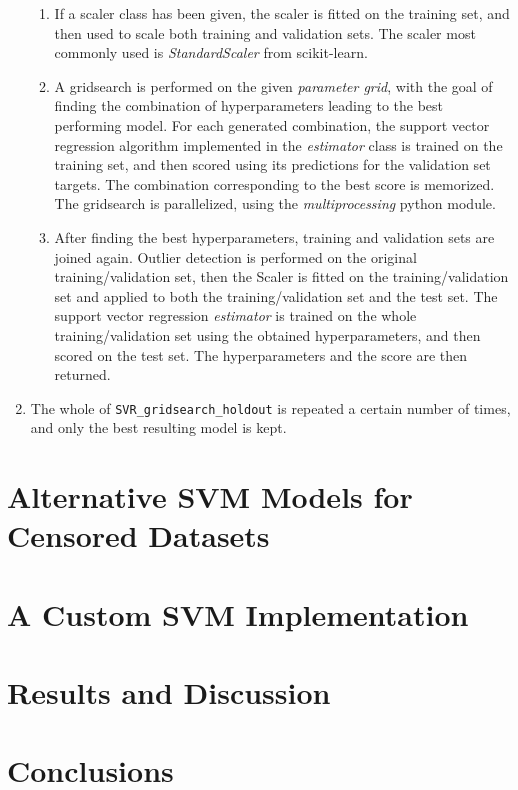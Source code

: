 \documentclass[12pt]{report}
\begin{document}
\begin{enumerate}
\begin{enumerate}
\item If a scaler class has been given, the scaler is fitted on the training set, and then used to scale both training and validation sets. The scaler most commonly used is \textit{StandardScaler} from scikit-learn.
\item A gridsearch is performed on the given \textit{parameter grid}, with the goal of finding the combination of hyperparameters leading to the best performing model. For each generated combination, the support vector regression algorithm implemented in the \textit{estimator} class is trained on the training set, and then scored using its predictions for the validation set targets. The combination corresponding to the best score is memorized. The gridsearch is parallelized, using the \textit{multiprocessing} python module.
\item After finding the best hyperparameters, training and validation sets are joined again. Outlier detection is performed on the original training/validation set, then the Scaler is fitted on the training/validation set and applied to both the training/validation set and the test set. The support vector regression \textit{estimator} is trained on the whole training/validation set using the obtained hyperparameters, and then scored on the test set. The hyperparameters and the score are then returned.
\end{enumerate}
\item The whole of \texttt{SVR\_gridsearch\_holdout} is repeated a certain number of times, and only the best resulting model is kept.
\end{enumerate}

\chapter{Alternative SVM Models for Censored Datasets}
\label{chaltsvm}

\chapter{A Custom SVM Implementation}
\label{chcustsvm}

\chapter{Results and Discussion}
\label{chres}

\chapter*{Conclusions}
\label{concl}
\end{document}

